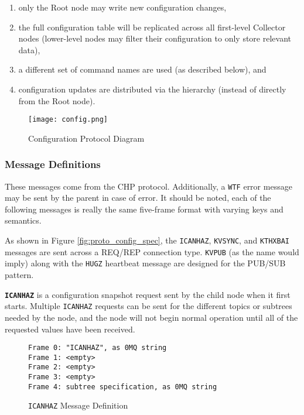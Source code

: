 \begin{enumerate}
\item only the Root node may write new configuration changes,
\item the full configuration table will be replicated across all first-level Collector nodes (lower-level nodes may
      filter their configuration to only store relevant data),
\item a different set of command names are used (as described below), and
\item configuration updates are distributed via the \dcamp hierarchy (instead of directly from the Root node).
\end{enumerate}

\begin{figure}[ht]
    \centering
    \texttt{[image: config.png]}
    \caption{Configuration Protocol Diagram}
    \label{fig:proto_config_image}
\end{figure}

\subsubsection{Message Definitions}

These messages come from the CHP protocol. Additionally, a \texttt{WTF} error message may be sent by the parent in case
of error. It should be noted, each of the following messages is really the same five-frame format with varying keys and
semantics.

As shown in Figure \ref{fig:proto_config_spec}, the \texttt{ICANHAZ}, \texttt{KVSYNC}, and \texttt{KTHXBAI} messages are
sent across a REQ/REP connection type. \texttt{KVPUB} (as the name would imply) along with the \texttt{HUGZ} heartbeat
message are designed for the PUB/SUB pattern.

\textbf{\texttt{ICANHAZ}} is a configuration snapshot request sent by the child node when it first starts. Multiple
\texttt{ICANHAZ} requests can be sent for the different topics or subtrees needed by the node, and the node will not
begin normal operation until all of the requested values have been received.

\begin{figure}[H]
\vspace{+10pt}
\begin{verbatim}
Frame 0: "ICANHAZ", as 0MQ string
Frame 1: <empty>
Frame 2: <empty>
Frame 3: <empty>
Frame 4: subtree specification, as 0MQ string
\end{verbatim}
\vspace{-20pt}
\caption{\texttt{ICANHAZ} Message Definition}
\label{fig:message_icanhaz}
\end{figure}

